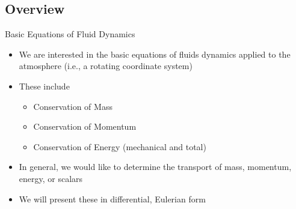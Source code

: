 \subsection{Overview}
\begin{frame}{Basic Equations of Fluid Dynamics}

\begin{itemize}
	\item We are interested in the basic equations of fluids dynamics applied to the atmosphere (i.e., a rotating coordinate system)
	\item These include
	\begin{itemize}
		\item Conservation of Mass
		\item Conservation of Momentum
		\item Conservation of Energy (mechanical and total)
	\end{itemize}
	\item In general, we would like to determine the transport of mass, momentum, energy, or scalars
	\item We will present these in differential, Eulerian form
\end{itemize}
\end{frame}
